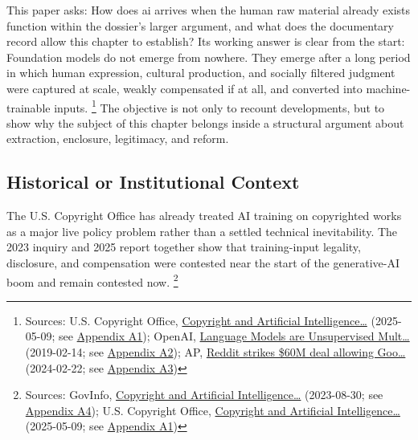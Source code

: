 \documentclass[
  american,
  11pt,
  letterpaper,
]{article}
\begin{document}
This paper asks: How does ai arrives when the human raw material already
exists function within the dossier's larger argument, and what does the
documentary record allow this chapter to establish? Its working answer
is clear from the start: Foundation models do not emerge from nowhere.
They emerge after a long period in which human expression, cultural
production, and socially filtered judgment were captured at scale,
weakly compensated if at all, and converted into machine-trainable
inputs. \footnote{Sources: U.S. Copyright Office,
  \href{https://copyright.gov/ai/Copyright-and-Artificial-Intelligence-Part-3-Generative-AI-Training-Report-Pre-Publication-Version.pdf}{Copyright
  and Artificial Intelligence\ldots{}} (2025-05-09; see
  \hyperref[appendix-a1-copyright-and-artificial-intelligence-part-3-generative-ai-training-pre-publication-version]{Appendix
  A1}); OpenAI,
  \href{https://cdn.openai.com/better-language-models/language_models_are_unsupervised_multitask_learners.pdf}{Language
  Models are Unsupervised Mult\ldots{}} (2019-02-14; see
  \hyperref[appendix-a2-language-models-are-unsupervised-multitask-learners]{Appendix
  A2}); AP,
  \href{https://apnews.com/article/a7f131c7cb4225307134ef21d3c6a708}{Reddit
  strikes \$60M deal allowing Goo\ldots{}} (2024-02-22; see
  \hyperref[appendix-a3-reddit-strikes-60m-deal-allowing-google-to-train-ai-models-on-its-posts-unveils-ipo-plans]{Appendix
  A3})} The objective is not only to recount developments, but to show
why the subject of this chapter belongs inside a structural argument
about extraction, enclosure, legitimacy, and reform.

\subsection{Historical or Institutional
Context}\label{historical-or-institutional-context}

The U.S. Copyright Office has already treated AI training on copyrighted
works as a major live policy problem rather than a settled technical
inevitability. The 2023 inquiry and 2025 report together show that
training-input legality, disclosure, and compensation were contested
near the start of the generative-AI boom and remain contested now.
\footnote{Sources: GovInfo,
  \href{https://www.govinfo.gov/content/pkg/FR-2023-08-30/pdf/2023-18624.pdf}{Copyright
  and Artificial Intelligence\ldots{}} (2023-08-30; see
  \hyperref[appendix-a4-copyright-and-artificial-intelligence-notice-of-inquiry]{Appendix
  A4}); U.S. Copyright Office,
  \href{https://copyright.gov/ai/Copyright-and-Artificial-Intelligence-Part-3-Generative-AI-Training-Report-Pre-Publication-Version.pdf}{Copyright
  and Artificial Intelligence\ldots{}} (2025-05-09; see
  \hyperref[appendix-a1-copyright-and-artificial-intelligence-part-3-generative-ai-training-pre-publication-version]{Appendix
  A1})}
\end{document}
